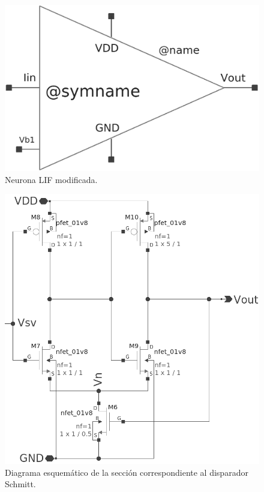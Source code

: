 \documentclass[conference]{IEEEtran}
\begin{document}
\begin{figure}[ht]
	\centering
	\includegraphics[scale=0.2]{img/cto_neurona_LIF_cc.png}
	\caption{Neurona LIF modificada.
		\label{fig:cto_neurona_LIF_cc}}
\end{figure}

\begin{figure}[ht]
	\centering
	\includegraphics[scale=0.17]{img/schmitt_trigger.png}
	\caption{Diagrama esquemático de la sección correspondiente al disparador Schmitt.
		\label{fig:schmitt_trigger}}
\end{figure}
\end{document}
